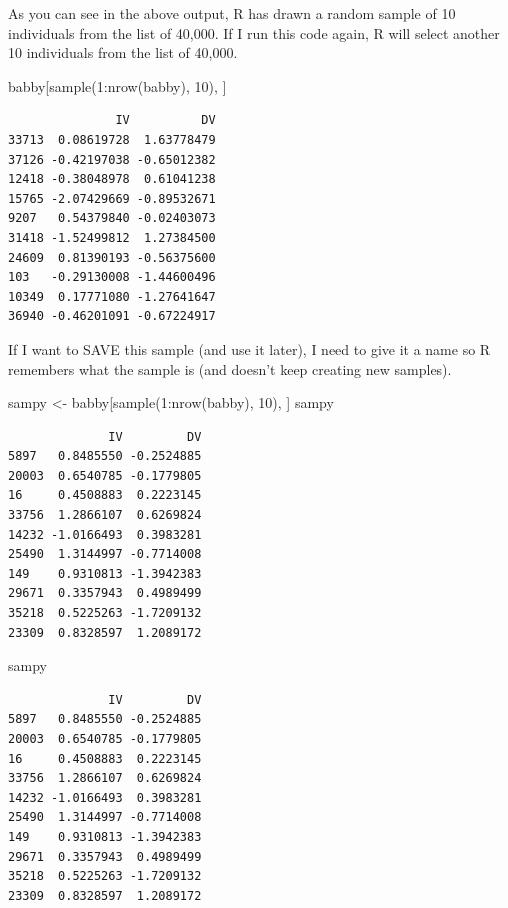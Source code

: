 \documentclass[
  letterpaper,
  DIV=11,
  numbers=noendperiod,
  oneside]{scrreprt}
\newenvironment{Shaded}{\begin{snugshade}}{\end{snugshade}}
\newcommand{\DecValTok}[1]{\textcolor[rgb]{0.68,0.00,0.00}{#1}}
\newcommand{\FunctionTok}[1]{\textcolor[rgb]{0.28,0.35,0.67}{#1}}
\newcommand{\NormalTok}[1]{\textcolor[rgb]{0.00,0.23,0.31}{#1}}
\newcommand{\OtherTok}[1]{\textcolor[rgb]{0.00,0.23,0.31}{#1}}
\newcommand{\SpecialCharTok}[1]{\textcolor[rgb]{0.37,0.37,0.37}{#1}}
\begin{document}
As you can see in the above output, R has drawn a random sample of 10
individuals from the list of 40,000. If I run this code again, R will
select another 10 individuals from the list of 40,000.

\begin{Shaded}
\begin{Highlighting}[]
\NormalTok{babby[}\FunctionTok{sample}\NormalTok{(}\DecValTok{1}\SpecialCharTok{:}\FunctionTok{nrow}\NormalTok{(babby), }\DecValTok{10}\NormalTok{), ]}
\end{Highlighting}
\end{Shaded}

\begin{verbatim}
               IV          DV
33713  0.08619728  1.63778479
37126 -0.42197038 -0.65012382
12418 -0.38048978  0.61041238
15765 -2.07429669 -0.89532671
9207   0.54379840 -0.02403073
31418 -1.52499812  1.27384500
24609  0.81390193 -0.56375600
103   -0.29130008 -1.44600496
10349  0.17771080 -1.27641647
36940 -0.46201091 -0.67224917
\end{verbatim}

If I want to SAVE this sample (and use it later), I need to give it a
name so R remembers what the sample is (and doesn't keep creating new
samples).~

\begin{Shaded}
\begin{Highlighting}[]
\NormalTok{sampy }\OtherTok{\textless{}{-}}\NormalTok{ babby[}\FunctionTok{sample}\NormalTok{(}\DecValTok{1}\SpecialCharTok{:}\FunctionTok{nrow}\NormalTok{(babby), }\DecValTok{10}\NormalTok{), ]}
\NormalTok{sampy}
\end{Highlighting}
\end{Shaded}

\begin{verbatim}
              IV         DV
5897   0.8485550 -0.2524885
20003  0.6540785 -0.1779805
16     0.4508883  0.2223145
33756  1.2866107  0.6269824
14232 -1.0166493  0.3983281
25490  1.3144997 -0.7714008
149    0.9310813 -1.3942383
29671  0.3357943  0.4989499
35218  0.5225263 -1.7209132
23309  0.8328597  1.2089172
\end{verbatim}

\begin{Shaded}
\begin{Highlighting}[]
\NormalTok{sampy}
\end{Highlighting}
\end{Shaded}

\begin{verbatim}
              IV         DV
5897   0.8485550 -0.2524885
20003  0.6540785 -0.1779805
16     0.4508883  0.2223145
33756  1.2866107  0.6269824
14232 -1.0166493  0.3983281
25490  1.3144997 -0.7714008
149    0.9310813 -1.3942383
29671  0.3357943  0.4989499
35218  0.5225263 -1.7209132
23309  0.8328597  1.2089172
\end{verbatim}
\end{document}
